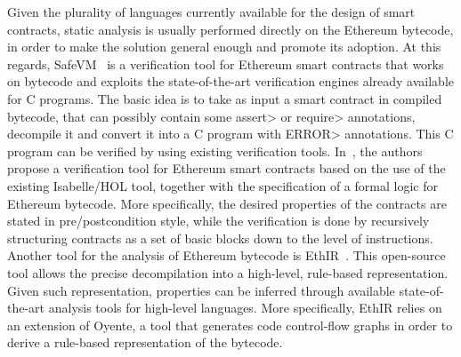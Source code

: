 Given the plurality of languages currently available for the design of smart contracts,
static analysis is usually performed directly on the Ethereum bytecode, in order to make
the solution general enough and promote its adoption. At this regards, SafeVM~\cite{safevm}
is a verification tool for Ethereum smart contracts that works on bytecode and exploits
the state-of-the-art verification engines already available for C programs.
The basic idea is to take as input a smart contract in compiled bytecode, that
can possibly contain some \<assert> or \<require> annotations, decompile it and convert it
into a C program with \<ERROR> annotations. This C program can be verified by using
existing verification tools.
%
In~\cite{hol_smart_constracts}, the authors propose a verification tool for Ethereum
smart contracts based on the use of the existing Isabelle/HOL tool, together with the
specification of a formal logic for Ethereum bytecode. More specifically, the desired properties
of the contracts are stated in pre/postcondition style, while the verification
is done by recursively structuring contracts as a set of basic blocks
down to the level of instructions.
%
Another tool for the analysis of Ethereum bytecode is EthIR~\cite{ethir}. This open-source tool
allows the precise decompilation into a high-level, rule-based representation. Given such
representation, properties can be inferred through available state-of-the-art analysis tools
for high-level languages. More specifically, EthIR relies on an extension of Oyente,
a tool that generates code control-flow graphs in order to derive
a rule-based representation of the bytecode.


